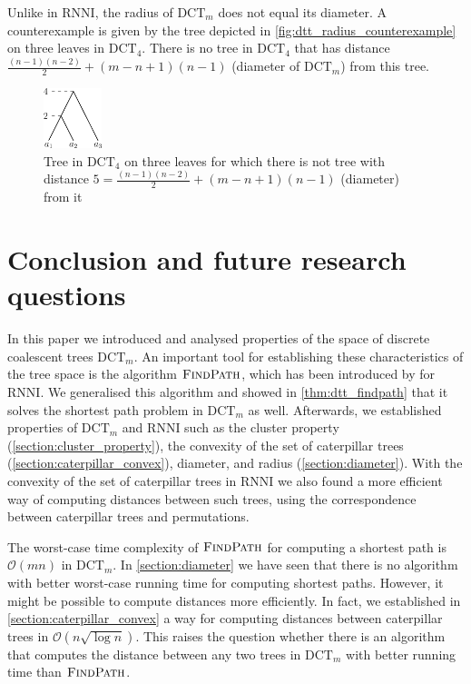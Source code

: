 \documentclass[11pt]{amsart}
\newcommand{\rnni}{\mathrm{RNNI}}
\newcommand{\findpath}{\textsc{FindPath}}
\newcommand{\dtt}{\mathrm{DCT}}
\renewcommand{\O}{\mathcal O}
\newcommand{\summary}[1]{} %
\begin{document}
Unlike in $\rnni$, the radius of $\dtt_m$ does not equal its diameter.
A counterexample is given by the tree depicted in \autoref{fig:dtt_radius_counterexample} on three leaves in $\dtt_4$.
There is no tree in $\dtt_4$ that has distance $\frac{(n-1)(n-2)}{2} + (m-n+1)(n-1)$ (diameter of $\dtt_m$) from this tree.

\begin{figure}[ht]
	\includegraphics[width=0.15\textwidth]{dtt_radius_counterexample.eps}
	\caption{Tree in $\dtt_4$ on three leaves for which there is not tree with distance $5 = \frac{(n-1)(n-2)}{2} + (m-n+1)(n-1)$ (diameter) from it}
	\label{fig:dtt_radius_counterexample}
\end{figure}


\section{Conclusion and future research questions}
\label{section:open_problems}

\summary{Brief summary of results of the paper}
In this paper we introduced and analysed properties of the space of discrete coalescent trees $\dtt_m$.
An important tool for establishing these characteristics of the tree space is the algorithm $\findpath$, which has been introduced by \textcite{Collienne2020-iu} for $\rnni$.
We generalised this algorithm and showed in \autoref{thm:dtt_findpath} that it solves the shortest path problem in $\dtt_m$ as well.
Afterwards, we established properties of $\dtt_m$ and $\rnni$ such as the cluster property (\autoref{section:cluster_property}), the convexity of the set of caterpillar trees (\autoref{section:caterpillar_convex}), diameter, and radius (\autoref{section:diameter}).
With the convexity of the set of caterpillar trees in $\rnni$ we also found a more efficient way of computing distances between such trees, using the correspondence between caterpillar trees and permutations.

\summary{More efficient algorithm for computing distances (not shortest paths)}
The worst-case time complexity of $\findpath$ for computing a shortest path is $\O(mn)$ in $\dtt_m$.
In \autoref{section:diameter} we have seen that there is no algorithm with better worst-case running time for computing shortest paths.
However, it might be possible to compute distances more efficiently.
In fact, we established in \autoref{section:caterpillar_convex} a way for computing distances between caterpillar trees in $\O(n \sqrt{\log n})$.
This raises the question whether there is an algorithm that computes the distance between any two trees in $\dtt_m$ with better running time than $\findpath$.
\end{document}
